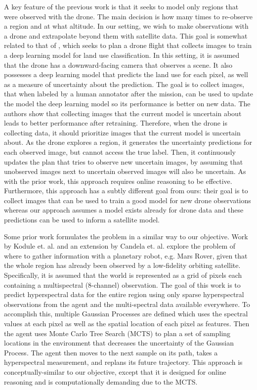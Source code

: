 A key feature of the previous work is that it seeks to model only regions that were observed with the drone. The main decision is how many times to re-observe a region and at what altitude. In our setting, we wish to make observations with a drone and extrapolate beyond them with satellite data. This goal is somewhat related to that of \cite{Ruckin2022}, which seeks to plan a drone flight that collects images to train a deep learning model for land use classification. In this setting, it is assumed that the drone has a downward-facing camera that observes a scene. It also possesses a deep learning model that predicts the land use for each pixel, as well as a measure of uncertainty about the prediction. The goal is to collect images, that when labeled by a human annotator after the mission, can be used to update the model the deep learning model so its performance is better on new data. The authors show that collecting images that the current model is uncertain about leads to better performance after retraining. Therefore, when the drone is collecting data, it should prioritize images that the current model is uncertain about. As the drone explores a region, it generates the uncertainty predictions for each observed image, but cannot access the true label. Then, it continuously updates the plan that tries to observe new uncertain images, by assuming that unobserved images next to uncertain observed images will also be uncertain. As with the prior work, this approach requires online reasoning to be effective. Furthermore, this approach has a subtly different goal from ours: their goal is to collect images that can be used to train a good model for new drone observations whereas our approach assumes a model exists already for drone data and these predictions can be used to inform a satellite model. 

Some prior work formulates the problem in a similar way to our objective. Work by Kodule et. al. \cite{Kodgule2019Non-myopicMeasurements} and an extension by Candela et. al. \cite{Candela2020PlanetaryMapping} explore the problem of where to gather information with a planetary robot, e.g. Mars Rover, given that the whole region has already been observed by a low-fidelity orbiting satellite. Specifically, it is assumed that the world is represented as a grid of pixels each containing a multispectral (8-channel) observation. The goal of this work is to predict hyperspectral data for the entire region using only sparse hyperspectral observations from the agent and the multi-spectral data available everywhere. To accomplish this, multiple Gaussian Processes \cite{Rasmussen2004} are defined which uses the spectral values at each pixel as well as the spatial location of each pixel as features. Then the agent uses Monte Carlo Tree Search (MCTS) \cite{Browne2012AMethods} to plan a set of sampling locations in the environment that decreases the uncertainty of the Gaussian Process. The agent then moves to the next sample on its path, takes a hyperspectral measurement, and replans its future trajectory. This approach is conceptually-similar to our objective, except that it is designed for online reasoning and is computationally demanding due to the MCTS.

